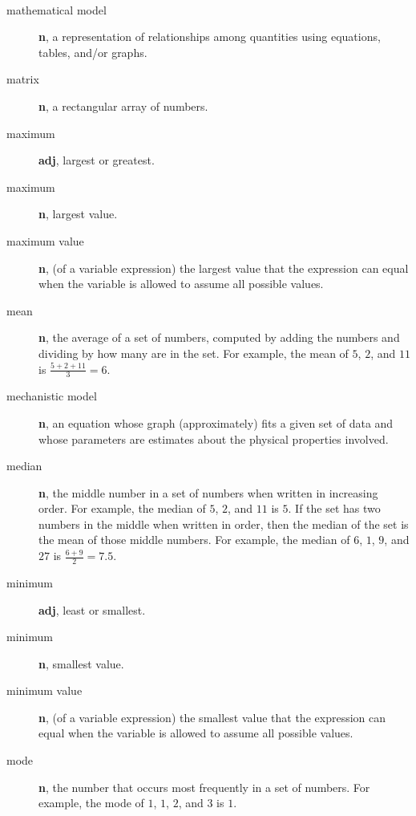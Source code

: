 \documentclass[10pt,]{book}
\newcommand{\terminology}[1]{\textbf{#1}}
\theoremstyle{plain}
\theoremstyle{definition}
\theoremstyle{definition}
\theoremstyle{definition}
\numberwithin{equation}{part}
\begin{document}
\paragraph[{}]{}\hypertarget{paragraphs-16}{}
\leavevmode%
\begin{description}
\item[{mathematical model}]\hypertarget{li-670}{}\terminology{n}, a representation of relationships among quantities using equations, tables, and/or graphs.%
\item[{matrix}]\hypertarget{li-671}{}\terminology{n}, a rectangular array of numbers.%
\item[{maximum}]\hypertarget{li-672}{}\terminology{adj}, largest or greatest.%
\item[{maximum}]\hypertarget{li-673}{}\terminology{n}, largest value.%
\item[{maximum value}]\hypertarget{li-674}{}\terminology{n}, (of a variable expression) the largest value that the expression can equal when the variable is allowed to assume all possible values.%
\item[{mean}]\hypertarget{li-675}{}\terminology{n}, the average of a set of numbers, computed by adding the numbers and dividing by how many are in the set. For example, the mean of \(5\), \(2\), and \(11\) is \(\frac{5+2+11}{3}= 6\).%
\item[{mechanistic model}]\hypertarget{li-676}{}\terminology{n}, an equation whose graph (approximately) fits a given set of data and whose parameters are estimates about the physical properties involved.%
\item[{median}]\hypertarget{li-677}{}\terminology{n}, the middle number in a set of numbers when written in increasing order. For example, the median of \(5\), \(2\), and \(11\) is \(5\). If the set has two numbers in the middle when written in order, then the median of the set is the mean of those middle numbers. For example, the median of \(6\), \(1\), \(9\), and \(27\) is \(\frac{6+9}{2}= 7.5\).%
\item[{minimum}]\hypertarget{li-678}{}\terminology{adj}, least or smallest.%
\item[{minimum}]\hypertarget{li-679}{}\terminology{n}, smallest value.%
\item[{minimum value}]\hypertarget{li-680}{}\terminology{n}, (of a variable expression) the smallest value that the expression can equal when the variable is allowed to assume all possible values.%
\item[{mode}]\hypertarget{li-681}{}\terminology{n}, the number that occurs most frequently in a set of numbers. For example, the mode of \(1\), \(1\), \(2\), and \(3\) is \(1\).%

\end{description}
\end{document}

